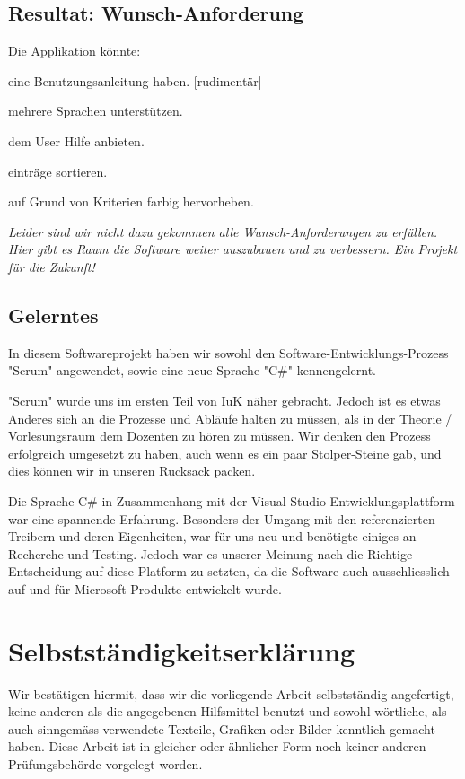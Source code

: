 \documentclass{article}
\begin{document}
\subsection{Resultat: Wunsch-Anforderung}
Die Applikation könnte:
\begin{description}
	\color{black}\item[W1:] eine Benutzungsanleitung haben. \color{green} {} \color{black}[rudimentär]
	\color{black}\item[W2:] mehrere Sprachen unterstützen.  \color{red}
	\color{black}\item[W3:] dem User Hilfe anbieten. \color{red}
	\color{black}\item[W4:] einträge sortieren. \color{red}
	\color{black}\item[W5:] auf Grund von Kriterien farbig hervorheben. \color{red}
\end{description}
\vspace{5mm}
\textit{Leider sind wir nicht dazu gekommen alle Wunsch-Anforderungen zu erfüllen. Hier gibt es Raum die Software weiter auszubauen und zu verbessern. Ein Projekt für die Zukunft!}
\subsection{Gelerntes}

In diesem Softwareprojekt haben wir sowohl den Software-Entwicklungs-Prozess "Scrum" angewendet, sowie eine neue Sprache "C\#" kennengelernt.

"Scrum" wurde uns im ersten Teil von IuK näher gebracht. Jedoch ist es etwas Anderes sich an die Prozesse und Abläufe halten zu müssen, als in der Theorie / Vorlesungsraum dem Dozenten zu hören zu müssen. Wir denken den Prozess erfolgreich umgesetzt zu haben, auch wenn es ein paar Stolper-Steine gab, und dies können wir in unseren Rucksack packen.

Die Sprache C\# in Zusammenhang mit der Visual Studio Entwicklungsplattform war eine spannende Erfahrung. Besonders der Umgang mit den referenzierten Treibern und deren Eigenheiten, war für uns neu und benötigte einiges an Recherche und Testing. Jedoch war es unserer Meinung nach die Richtige Entscheidung auf diese Platform zu setzten, da die Software auch ausschliesslich auf und für Microsoft Produkte entwickelt wurde.

\section{Selbstständigkeitserklärung}
Wir bestätigen hiermit, dass wir die vorliegende Arbeit selbstständig angefertigt,
keine anderen als die angegebenen Hilfsmittel benutzt und sowohl wörtliche, als auch sinngemäss
verwendete Texteile, Grafiken oder Bilder kenntlich gemacht haben.
Diese Arbeit ist in gleicher oder ähnlicher Form noch keiner anderen Prüfungsbehörde vorgelegt
worden. 
\\
\\
\end{document}
